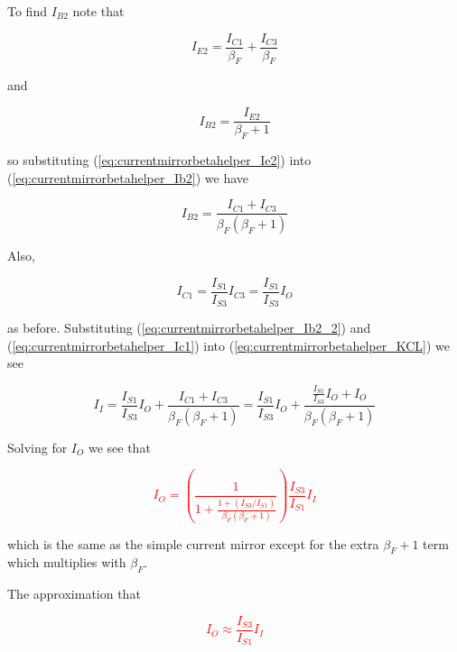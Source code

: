 To find $I_{B2}$ note that

\begin{equation}
I_{E2} = \frac{I_{C1}}{\beta_{F}} + \frac{I_{C3}}{\beta_{F}}
\label{eq:currentmirrorbetahelper_Ie2}
\end{equation}

and

\begin{equation}
I_{B2} = \frac{I_{E2}}{\beta_{F} + 1}
\label{eq:currentmirrorbetahelper_Ib2}
\end{equation}

so substituting (\ref{eq:currentmirrorbetahelper_Ie2}) into (\ref{eq:currentmirrorbetahelper_Ib2}) we have

\begin{equation}
I_{B2} = \frac{I_{C1} + I_{C3}}{\beta_{F}(\beta_{F} + 1)}
\label{eq:currentmirrorbetahelper_Ib2_2}
\end{equation}

Also,

\begin{equation}
I_{C1} = \frac{I_{S1}}{I_{S3}}I_{C3} = \frac{I_{S1}}{I_{S3}}I_{O}
\label{eq:currentmirrorbetahelper_Ic1}
\end{equation}

as before.
Substituting (\ref{eq:currentmirrorbetahelper_Ib2_2}) and (\ref{eq:currentmirrorbetahelper_Ic1}) into (\ref{eq:currentmirrorbetahelper_KCL}) we see

\begin{equation}
I_{I} = \frac{I_{S1}}{I_{S3}}I_{O} + \frac{I_{C1} + I_{C3}}{\beta_{F}(\beta_{F} + 1)} = \frac{I_{S1}}{I_{S3}}I_{O} + \frac{\frac{I_{S1}}{I_{S3}}I_{O} + I_{O}}{\beta_{F}(\beta_{F} + 1)}
\end{equation}

Solving for $I_{O}$ we see that

\textcolor{red}{
\begin{equation}
I_{O} = \left(\frac{1}{1 + \frac{1 + (I_{S3}/I_{S1})}{\beta_{F}(\beta_{F} + 1)}}\right)\frac{I_{S3}}{I_{S1}}I_{I}
\label{eq:currentmirrorbetahelper}
\end{equation}
}

which is the same as the simple current mirror except for the extra $\beta_{F} + 1$ term which multiplies with $\beta_{F}$.

The approximation that

\textcolor{red}{
\begin{equation}
I_{O} \approx \frac{I_{S3}}{I_{S1}}I_{I}
\label{eq:currentmirrorbetahelper_approx}
\end{equation}
}

